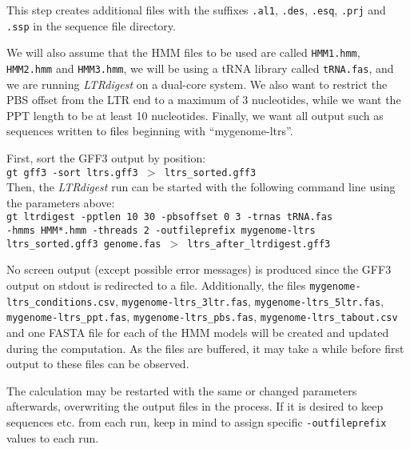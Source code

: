 \documentclass[12pt,titlepage]{article}
\newcommand{\LTRdigest}{\textit{LTRdigest}\xspace}
\newcommand{\GtLTRdigest}{\texttt{gt ltrdigest}\xspace}
\begin{document}
This step creates additional files with the suffixes \texttt{.al1}, \texttt{.des}, \texttt{.esq}, \texttt{.prj} and \texttt{.ssp} in the sequence file directory.

We will also assume that the HMM files to be used are called \texttt{HMM1.hmm}, \texttt{HMM2.hmm} and \texttt{HMM3.hmm}, we will be using a tRNA library called \texttt{tRNA.fas}, and we are running \LTRdigest on a dual-core system. We also want to restrict the PBS offset from the LTR end to a maximum of 3 nucleotides, while we want the PPT length to be at least 10 nucleotides. Finally, we want all output such as sequences written to files beginning with ``mygenome-ltrs''.

First, sort the GFF3 output by position:
\\[0.5cm]
\texttt{gt gff3 -sort ltrs.gff3 $>$ ltrs\_sorted.gff3}
\\[0.5cm]
Then, the \LTRdigest run can be started with the following command line using the parameters above:
\\[0.5cm]
\texttt{\GtLTRdigest\ -pptlen 10 30 -pbsoffset 0 3 -trnas tRNA.fas \\-hmms HMM*.hmm -threads 2 -outfileprefix mygenome-ltrs ltrs\_sorted.gff3 genome.fas $>$ ltrs\_after\_ltrdigest.gff3}

No screen output (except possible error messages) is produced since the GFF3 output on stdout is redirected to a file. Additionally, the files \texttt{mygenome\--ltrs\_conditions.csv}, \texttt{mygenome\--ltrs\_3ltr.fas}, \texttt{mygenome\--ltrs\_5ltr.fas}, \texttt{mygenome\--ltrs\_ppt.fas}, \texttt{mygenome\--ltrs\_pbs.fas}, \texttt{mygenome-\-ltrs\_tabout.csv} and one FASTA file for each of the HMM models will be created and updated during the computation. As the files are buffered, it may take a while before first output to these files can be observed.

The calculation may be restarted with the same or changed parameters afterwards, overwriting the output files in the process. If it is desired to keep sequences etc. from each run, keep in mind to assign specific \texttt{-outfileprefix} values to each run.
\end{document}
